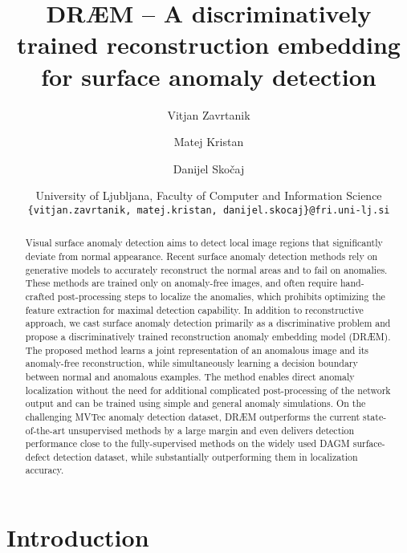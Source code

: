 \documentclass[10pt,twocolumn,letterpaper]{article}
\begin{document}
\title{DR{\AE}M -- A discriminatively trained reconstruction embedding for surface anomaly detection}

\author{Vitjan Zavrtanik \and Matej Kristan \and Danijel Skočaj \and
University of Ljubljana, Faculty of Computer and Information Science \\
{\tt\small \{vitjan.zavrtanik, matej.kristan, danijel.skocaj\}@fri.uni-lj.si}
}





\maketitle


\begin{abstract}

Visual surface anomaly detection aims to detect local image regions that significantly deviate from normal appearance. Recent surface anomaly detection methods rely on generative models to accurately reconstruct the normal areas and to fail on anomalies. These methods are trained only on anomaly-free images, and often require hand-crafted post-processing steps to localize the anomalies, which prohibits optimizing the feature extraction for maximal detection capability. In addition to reconstructive approach, we cast surface anomaly detection primarily as a discriminative problem and propose a discriminatively trained reconstruction anomaly embedding model (DR{\AE}M). The proposed method learns a joint representation of an anomalous image and its anomaly-free reconstruction, while simultaneously learning a decision boundary between normal and anomalous examples. The method enables direct anomaly localization without the need for additional complicated post-processing of the network output and can be trained using simple and general anomaly simulations. On the challenging MVTec anomaly detection dataset, DR{\AE}M outperforms the current state-of-the-art unsupervised methods by a large margin and even delivers detection performance close to the fully-supervised methods on the widely used DAGM surface-defect detection dataset, while substantially outperforming them in localization accuracy. 







\end{abstract}

\section{Introduction}
\end{document}
